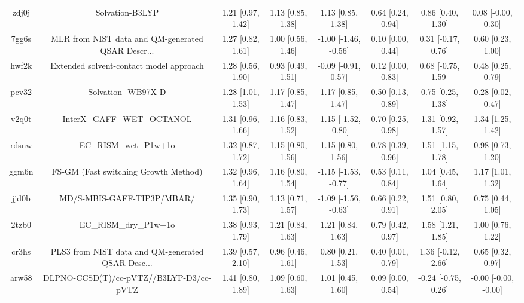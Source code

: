 \documentclass{article}
\begin{document}
\begin{center}
\begin{longtable}{|cccccccc|}
 zdj0j &                                    Solvation-B3LYP &  1.21 [0.97, 1.42] &  1.13 [0.85, 1.38] &     1.13 [0.85, 1.38] &  0.64 [0.24, 0.94] &    0.86 [0.40, 1.30] &    0.08 [-0.00, 0.30] \\
 7gg6s &  MLR from NIST data and QM-generated QSAR Descr... &  1.27 [0.82, 1.61] &  1.00 [0.56, 1.46] &  -1.00 [-1.46, -0.56] &  0.10 [0.00, 0.44] &   0.31 [-0.17, 0.76] &     0.60 [0.23, 1.00] \\
 hwf2k &            Extended solvent-contact model approach &  1.28 [0.56, 1.90] &  0.93 [0.49, 1.51] &   -0.09 [-0.91, 0.57] &  0.12 [0.00, 0.83] &   0.68 [-0.75, 1.59] &     0.48 [0.25, 0.79] \\
 pcv32 &                                 Solvation- WB97X-D &  1.28 [1.01, 1.53] &  1.17 [0.85, 1.47] &     1.17 [0.85, 1.47] &  0.50 [0.13, 0.89] &    0.75 [0.25, 1.38] &     0.28 [0.02, 0.47] \\
 v2q0t &                         InterX\_GAFF\_WET\_OCTANOL &  1.31 [0.96, 1.66] &  1.16 [0.83, 1.52] &  -1.15 [-1.52, -0.80] &  0.70 [0.25, 0.98] &    1.31 [0.92, 1.57] &     1.34 [1.25, 1.42] \\
 rdsnw &                              EC\_RISM\_wet\_P1w+1o &  1.32 [0.87, 1.72] &  1.15 [0.80, 1.56] &     1.15 [0.80, 1.56] &  0.78 [0.39, 0.96] &    1.51 [1.15, 1.78] &     0.98 [0.73, 1.20] \\
 ggm6n &               FS-GM (Fast switching Growth Method) &  1.32 [0.96, 1.64] &  1.16 [0.80, 1.54] &  -1.15 [-1.53, -0.77] &  0.53 [0.11, 0.84] &    1.04 [0.45, 1.64] &     1.17 [1.01, 1.32] \\
 jjd0b &                         MD/S-MBIS-GAFF-TIP3P/MBAR/ &  1.35 [0.90, 1.73] &  1.13 [0.71, 1.57] &  -1.09 [-1.56, -0.63] &  0.66 [0.22, 0.91] &    1.51 [0.80, 2.05] &     0.75 [0.44, 1.05] \\
 2tzb0 &                              EC\_RISM\_dry\_P1w+1o &  1.38 [0.93, 1.79] &  1.21 [0.84, 1.63] &     1.21 [0.84, 1.63] &  0.79 [0.42, 0.97] &    1.58 [1.21, 1.85] &     1.00 [0.76, 1.22] \\
 cr3hs &  PLS3 from NIST data and QM-generated QSAR Desc... &  1.39 [0.57, 2.10] &  0.96 [0.46, 1.61] &     0.80 [0.21, 1.53] &  0.40 [0.01, 0.79] &   1.36 [-0.12, 2.66] &     0.65 [0.32, 0.97] \\
 arw58 &            DLPNO-CCSD(T)/cc-pVTZ//B3LYP-D3/cc-pVTZ &  1.41 [0.80, 1.89] &  1.09 [0.60, 1.63] &     1.01 [0.45, 1.60] &  0.09 [0.00, 0.54] &  -0.24 [-0.75, 0.26] &  -0.00 [-0.00, -0.00] \\

\end{longtable}
\end{center}
\end{document}
